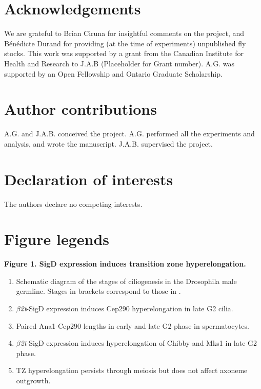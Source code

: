 \documentclass[12pt, twoside, letterpaper]{article}
\newcommand{\sigd}{$\beta$\textit{2t}-SigD}
\begin{document}
\begin{doublespacing}
\begin{linenumbers}
    \section{Acknowledgements}
    We are grateful to Brian Ciruna for insightful comments on the project,
    and B{\'e}n{\'e}dicte Durand for providing (at the time of experiments)
    unpublished fly stocks.
    This work was supported by a grant from the Canadian Institute for
    Health and Research to J.A.B (Placeholder for Grant number).
    A.G. was supported by an Open Fellowship and Ontario Graduate Scholarship.
    
    \section{Author contributions}
    A.G. and J.A.B. conceived the project.
    A.G. performed all the experiments and analysis, and wrote the manuscript.
    J.A.B. supervised the project.
    
    \section{Declaration of interests}
    The authors declare no competing interests.

    \section{Figure legends}
    
    \textbf{Figure 1. SigD expression induces transition zone hyperelongation.}
    \begin{enumerate}[label={(\Alph*)}, nolistsep]
    \item Schematic diagram of the stages of ciliogenesis in the Drosophila male germline.
      Stages in brackets correspond to those in \citep{cenci1994chromatin}.
    \item \sigd{} expression induces Cep290 hyperelongation in late G2 cilia.
    \item Paired Ana1-Cep290 lengths in early and late G2 phase in spermatocytes.
    \item \sigd{} expression induces hyperelongation of Chibby and Mks1 in late G2 phase.
    \item TZ hyperelongation persists through meiosis but does not affect
      axoneme outgrowth.
    \end{enumerate}
    

\end{linenumbers}
\end{doublespacing}
\end{document}

